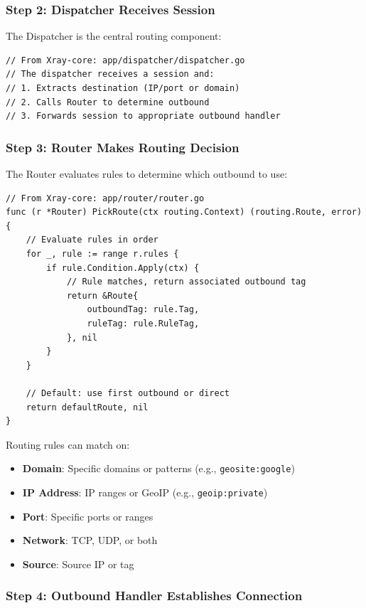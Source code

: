 \subsubsection{Step 2: Dispatcher Receives Session}

The Dispatcher is the central routing component:

\begin{verbatim}
// From Xray-core: app/dispatcher/dispatcher.go
// The dispatcher receives a session and:
// 1. Extracts destination (IP/port or domain)
// 2. Calls Router to determine outbound
// 3. Forwards session to appropriate outbound handler
\end{verbatim}

\subsubsection{Step 3: Router Makes Routing Decision}

The Router evaluates rules to determine which outbound to use:

\begin{verbatim}
// From Xray-core: app/router/router.go
func (r *Router) PickRoute(ctx routing.Context) (routing.Route, error) {
    // Evaluate rules in order
    for _, rule := range r.rules {
        if rule.Condition.Apply(ctx) {
            // Rule matches, return associated outbound tag
            return &Route{
                outboundTag: rule.Tag,
                ruleTag: rule.RuleTag,
            }, nil
        }
    }
    
    // Default: use first outbound or direct
    return defaultRoute, nil
}
\end{verbatim}

Routing rules can match on:
\begin{itemize}
    \item \textbf{Domain}: Specific domains or patterns (e.g., \texttt{geosite:google})
    \item \textbf{IP Address}: IP ranges or GeoIP (e.g., \texttt{geoip:private})
    \item \textbf{Port}: Specific ports or ranges
    \item \textbf{Network}: TCP, UDP, or both
    \item \textbf{Source}: Source IP or tag
\end{itemize}

\subsubsection{Step 4: Outbound Handler Establishes Connection}

